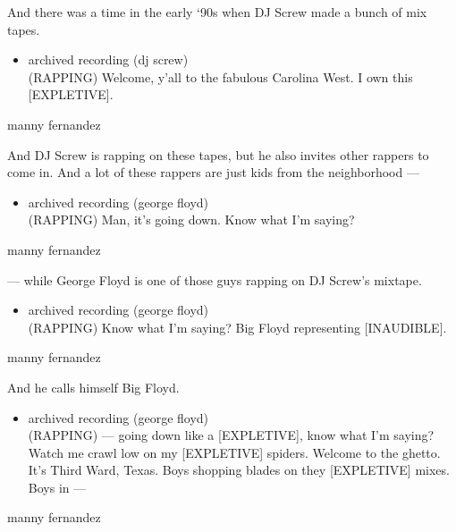 And there was a time in the early `90s when DJ Screw made a bunch of mix
tapes.

\begin{itemize}
\tightlist
\item
  archived recording (dj screw)\\
  (RAPPING) Welcome, y'all to the fabulous Carolina West. I own this
  {[}EXPLETIVE{]}.
\end{itemize}

manny fernandez

And DJ Screw is rapping on these tapes, but he also invites other
rappers to come in. And a lot of these rappers are just kids from the
neighborhood ---

\begin{itemize}
\tightlist
\item
  archived recording (george floyd)\\
  (RAPPING) Man, it's going down. Know what I'm saying?
\end{itemize}

manny fernandez

--- while George Floyd is one of those guys rapping on DJ Screw's
mixtape.

\begin{itemize}
\tightlist
\item
  archived recording (george floyd)\\
  (RAPPING) Know what I'm saying? Big Floyd representing
  {[}INAUDIBLE{]}.
\end{itemize}

manny fernandez

And he calls himself Big Floyd.

\begin{itemize}
\tightlist
\item
  archived recording (george floyd)\\
  (RAPPING) --- going down like a {[}EXPLETIVE{]}, know what I'm saying?
  Watch me crawl low on my {[}EXPLETIVE{]} spiders. Welcome to the
  ghetto. It's Third Ward, Texas. Boys shopping blades on they
  {[}EXPLETIVE{]} mixes. Boys in ---
\end{itemize}

manny fernandez

